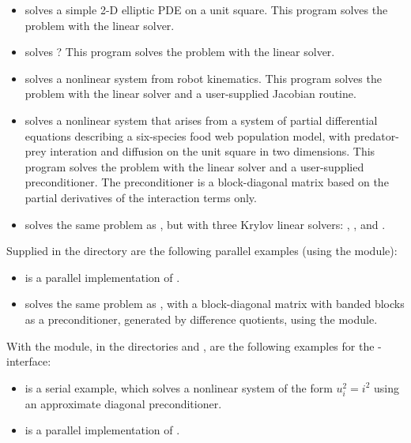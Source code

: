 \begin{itemize}
\item {}
  solves a simple 2-D elliptic PDE on a unit square.
 \newline
  This program solves the problem with the {\kinband} linear solver.
\item {}
  solves ?
  \newline
  This program solves the problem with the {\kindense} linear solver.
\item {}
  solves a nonlinear system from robot kinematics.
  \newline
  This program solves the problem with the {\kindense} linear solver
  and a user-supplied Jacobian routine.
\item {}
  solves a nonlinear system that arises from a system of partial
  differential equations describing a six-species food web population
  model, with predator-prey interation and diffusion on the unit
  square in two dimensions.
  \newline
  This program solves the problem with the {\kinspgmr} linear solver
  and a user-supplied preconditioner. The preconditioner is a
  block-diagonal matrix based on the partial derivatives of the
  interaction terms only.
\item {}
  solves the same problem as , but with three Krylov
  linear solvers: , , and .
\end{itemize}
Supplied in the  directory are
the following parallel examples (using the {\nvecp} module):
\begin{itemize}
\item {}
  is a parallel implementation of .
\item {}
  solves the same problem as , with a block-diagonal matrix
  with banded blocks as a preconditioner, generated by difference quotients,
  using the {\kinbbdpre} module.
\end{itemize}
With the {\fkinsol} module, in the directories 
 and
, are the following examples for
the {\F}-{\C} interface:
\begin{itemize}
\item {}
  is a serial example, which solves a nonlinear system of the form
  $u_i^2 = i^2$ using an approximate diagonal preconditioner.
\item {}
  is a parallel implementation of .
\end{itemize}

